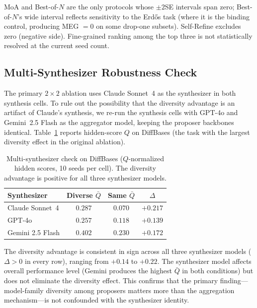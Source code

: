\documentclass{article}
\begin{document}
\noindent MoA and Best-of-$N$ are the only protocols whose $\pm2$SE intervals span zero; Best-of-$N$'s wide interval reflects sensitivity to the Erd\H{o}s task (where it is the binding control, producing MEG $= 0$ on some drop-one subsets). Self-Refine excludes zero (negative side). Fine-grained ranking among the top three is not statistically resolved at the current seed count.

\subsection{Multi-Synthesizer Robustness Check}
\label{app:multisynth}

The primary $2{\times}2$ ablation uses Claude Sonnet~4 as the synthesizer in both synthesis cells. To rule out the possibility that the diversity advantage is an artifact of Claude's synthesis, we re-run the synthesis cells with GPT-4o and Gemini~2.5 Flash as the aggregator model, keeping the proposer backbones identical. Table~\ref{tab:multisynth} reports hidden-score $Q$ on DiffBases (the task with the largest diversity effect in the original ablation).

\begin{table}[h]
\caption{Multi-synthesizer check on DiffBases ($Q$-normalized hidden scores, 10 seeds per cell). The diversity advantage is positive for all three synthesizer models.}
\label{tab:multisynth}
\centering
\small
\begin{tabular}{l c c c}
\toprule
Synthesizer & Diverse $\bar{Q}$ & Same $\bar{Q}$ & $\Delta$ \\
\midrule
Claude Sonnet~4 & $0.287$ & $0.070$ & $+0.217$ \\
GPT-4o          & $0.257$ & $0.118$ & $+0.139$ \\
Gemini 2.5 Flash & $0.402$ & $0.230$ & $+0.172$ \\
\bottomrule
\end{tabular}
\end{table}

\noindent The diversity advantage is consistent in sign across all three synthesizer models ($\Delta > 0$ in every row), ranging from $+0.14$ to $+0.22$. The synthesizer model affects overall performance level (Gemini produces the highest $\bar{Q}$ in both conditions) but does not eliminate the diversity effect. This confirms that the primary finding---model-family diversity among proposers matters more than the aggregation mechanism---is not confounded with the synthesizer identity.
\end{document}
